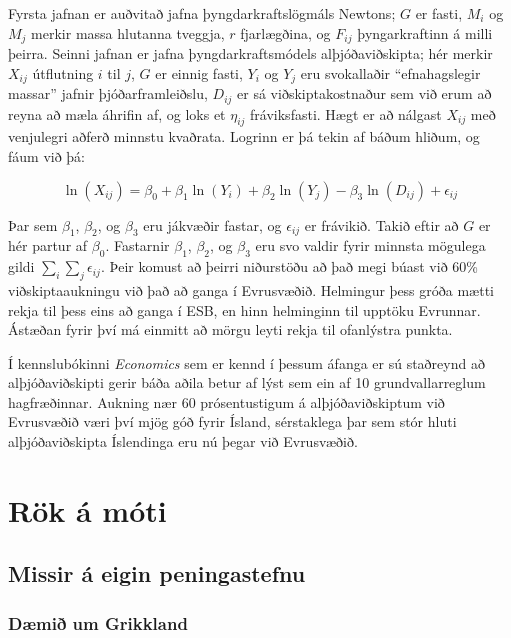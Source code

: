 \documentclass[a4paper]{article}
\begin{document}
Fyrsta jafnan er auðvitað jafna þyngdarkraftslögmáls Newtons; \(G\) er fasti, \(M_{i}\) og \(M_{j}\) merkir massa hlutanna tveggja, \(r\) fjarlægðina, og \(F_{ij}\) þyngarkraftinn á milli þeirra. Seinni jafnan er jafna þyngdarkraftsmódels alþjóðaviðskipta; hér merkir \(X_{ij}\) útflutning \(i\) til \(j\), \(G\) er einnig fasti, \(Y_{i}\) og \(Y_{j}\) eru svokallaðir ``efnahagslegir massar'' jafnir þjóðarframleiðslu, \(D_{ij}\) er sá viðskiptakostnaður sem við erum að reyna að mæla áhrifin af, og loks et \(\eta_{ij}\) fráviksfasti. Hægt er að nálgast \(X_{ij}\) með venjulegri aðferð minnstu kvaðrata. Logrinn er þá tekin af báðum hliðum, og fáum við þá:

\[\ln(X_{ij}) = \beta_{0} + \beta_{1}\ln(Y_{i}) + \beta_{2}\ln(Y_{j}) - \beta_{3}\ln(D_{ij}) + \epsilon_{ij}\]

Þar sem \(\beta_{1}\), \(\beta_{2}\), og \(\beta_{3}\) eru jákvæðir fastar, og \(\epsilon_{ij}\) er frávikið. Takið eftir að \(G\) er hér partur af \(\beta_{0}\). Fastarnir \(\beta_{1}\), \(\beta_{2}\), og \(\beta_{3}\) eru svo valdir fyrir minnsta mögulega gildi \(\sum_{i}\sum_{j}\epsilon_{ij}\).\cite{gravity_powerpoint} Þeir komust að þeirri niðurstöðu að það megi búast við 60\% viðskiptaaukningu við það að ganga í Evrusvæðið. Helmingur þess gróða mætti rekja til þess eins að ganga í ESB, en hinn helminginn til upptöku Evrunnar. Ástæðan fyrir því má einmitt að mörgu leyti rekja til ofanlýstra punkta.\cite{icb_wp_26}

Í kennslubókinni \textit{Economics} sem er kennd í þessum áfanga er sú staðreynd að alþjóðaviðskipti gerir báða aðila betur af lýst sem ein af 10 grundvallarreglum hagfræðinnar.\cite{economics} Aukning nær 60 prósentustigum á alþjóðaviðskiptum við Evrusvæðið væri því mjög góð fyrir Ísland, sérstaklega þar sem stór hluti alþjóðaviðskipta Íslendinga eru nú þegar við Evrusvæðið.\cite{hvada_gjaldmidill}

\section{Rök á móti}

\subsection{Missir á eigin peningastefnu}

\subsubsection{Dæmið um Grikkland}
\end{document}

